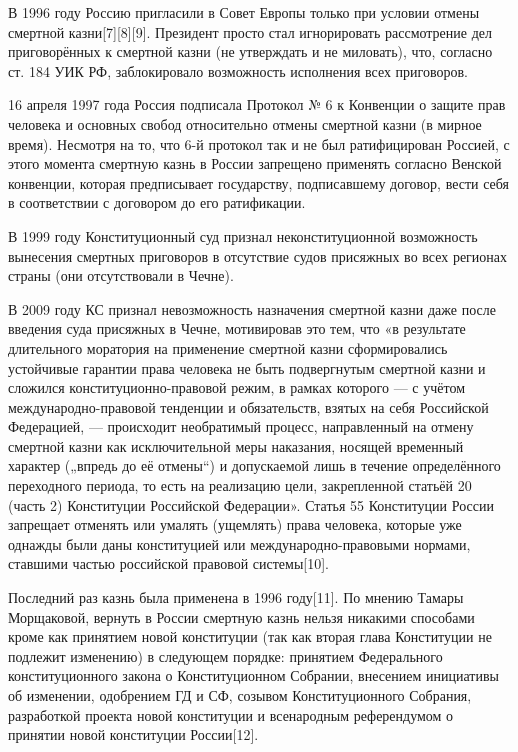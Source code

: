 В 1996 году Россию пригласили в Совет Европы только при условии отмены смертной казни[7][8][9]. Президент просто стал игнорировать рассмотрение дел приговорённых к смертной казни (не утверждать и не миловать), что, согласно ст. 184 УИК РФ, заблокировало возможность исполнения всех приговоров.

16 апреля 1997 года Россия подписала Протокол № 6 к Конвенции о защите прав человека и основных свобод относительно отмены смертной казни (в мирное время). Несмотря на то, что 6-й протокол так и не был ратифицирован Россией, с этого момента смертную казнь в России запрещено применять согласно Венской конвенции, которая предписывает государству, подписавшему договор, вести себя в соответствии с договором до его ратификации.

В 1999 году Конституционный суд признал неконституционной возможность вынесения смертных приговоров в отсутствие судов присяжных во всех регионах страны (они отсутствовали в Чечне).

В 2009 году КС признал невозможность назначения смертной казни даже после введения суда присяжных в Чечне, мотивировав это тем, что «в результате длительного моратория на применение смертной казни сформировались устойчивые гарантии права человека не быть подвергнутым смертной казни и сложился конституционно-правовой режим, в рамках которого — с учётом международно-правовой тенденции и обязательств, взятых на себя Российской Федерацией, — происходит необратимый процесс, направленный на отмену смертной казни как исключительной меры наказания, носящей временный характер („впредь до её отмены“) и допускаемой лишь в течение определённого переходного периода, то есть на реализацию цели, закрепленной статьёй 20 (часть 2) Конституции Российской Федерации». Статья 55 Конституции России запрещает отменять или умалять (ущемлять) права человека, которые уже однажды были даны конституцией или международно-правовыми нормами, ставшими частью российской правовой системы[10].

Последний раз казнь была применена в 1996 году[11]. По мнению Тамары Морщаковой, вернуть в России смертную казнь нельзя никакими способами кроме как принятием новой конституции (так как вторая глава Конституции не подлежит изменению) в следующем порядке: принятием Федерального конституционного закона о Конституционном Собрании, внесением инициативы об изменении, одобрением ГД и СФ, созывом Конституционного Собрания, разработкой проекта новой конституции и всенародным референдумом о принятии новой конституции России[12].

